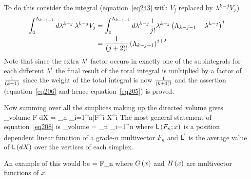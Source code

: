 \ee
To do this consider the integral (equation~\ref{eq243} with $V_{j}$ replaced by $\lambda^{k-j}V_{j}$) 
\begin{align}
\int_{0}^{\Lambda_{k-j-1}}d\lambda^{k-j}\:\lambda^{k-j}V_{j} &= \int_{0}^{\Lambda_{k-j-1}}
		d\lambda^{k-j}\displaystyle\frac{1}{j!}\lambda^{k-j}\left ( {\Lambda_{k-j-1}-\lambda^{k-j}} \right )^{j} \nonumber \\
	&= \displaystyle\frac{1}{\left ( {j+2} \right )!}\left ( {\Lambda_{k-j-1}} \right )^{j+2}
\end{align}
Note that since the extra $\lambda^{i}$ factor occurs in exactly one of the subintegrals for each different $\lambda^{i}$ the
final result of the total integral is multiplied by a factor of $\frac{1}{\left ( {k+1} \right )}$ since the weight of the total integral 
is now $\frac{1}{\left ( {k+1} \right )!}$ and the assertion (equation~\ref{eq206} and hence equation~\ref{eq205}) is proved.

Now summing over all the simplices making up the directed volume gives
\be\label{eq208}
\int_{\mbox{volume}} F\: dX = \lim_{n\mapsto\infty} \sum_{i=1}^{n}\bar{F}^{i} \Delta X^{i}
\ee
The most general statement of equation~\ref{eq208} is
\be
\int_{\mbox{volume}}  = \lim_{n\mapsto\infty} \sum_{i=1}^{n}
\ee
where ${\mathsf{L}}\left ( {F_{n};x} \right )$ is a position dependent linear function of a grade-$n$ multivector $F_{n}$ and 
$\bar{\mathsf{L}}^{i}$ is the average value of ${\mathsf{L}}\left ( {dX} \right )$ over the vertices of each simplex.

An example of this would be
\be
	 =  F_{n}  
\ee
where ${G}\left ( {x} \right )$ and ${H}\left ( {x} \right )$ are multivector functions of $x$.
